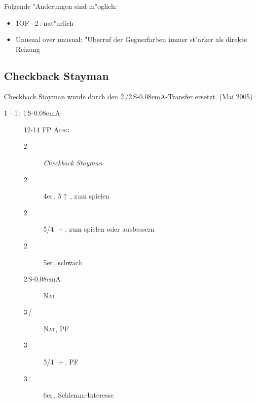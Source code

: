 \documentclass[11pt,german,twocolumn]{scrartcl}
\renewcommand{\Cl}{{\color{ClColor}{$\clubsuit$}}}
\renewcommand{\Di}{{\color{DiColor}{$\vardiamondsuit$}}}
\renewcommand{\He}{{\color{HeColor}{$\varheartsuit$}}}
\renewcommand{\Sp}{{\color{SpColor}{$\spadesuit$}}}
\def\pik{\,\Sp}
\def\coe{\,\He}
\def\kar{\,\Di}
\def\tre{\,\Cl}
\def\mi{\,\Cl /\Di}
\def\pl{$\uparrow$}
\def\ofa{\textsf{OF}}
\def\SA{\textsf{\,S\kern-0.08emA}}
\def\sep{\,--\,}
\newcommand{\conv}[1]{\emph{#1}}
\def\bal{\textsc{Ausg}}
\def\nat{\textsc{Nat}}
\def\pf{\textsc{PF}}
\def\bdsc{\begin{description}}
\def\edsc{\end{description}}
\begin{document}
\begin{appendix}
Folgende "Anderungen sind m"oglich:
%
\begin{itemize}
\item 1\ofa\sep2\tre: nat"urlich
\item Unusual over unusual: "Uberruf der Gegnerfarben immer st"arker als direkte Reizung
\end{itemize}

\subsection{Checkback Stayman}

Checkback Stayman wurde durch den 2\tre/2\SA-Transfer ersetzt. (Mai 2005)

\bdsc
\item[1\tre\sep1\pik; 1\SA] 12-14 FP \bal
  \bdsc
  \item[2\tre] \conv{Checkback Stayman}
  \item[2\kar] 4er\pik, 5\pl{}\kar, zum spielen
  \item[2\coe] 5/4 \pik\,+\coe, zum spielen oder ausbessern
  \item[2\pik] 5er\pik, schwach
  \item[2\SA] \nat
  \item[3\mi] \nat, \pf
  \item[3\coe] 5/4 \pik\,+\coe, \pf
  \item[3\pik] 6er\pik, Schlemm-Interesse\footnotemark[1]
  \edsc
\edsc


\end{appendix}
\end{document}
